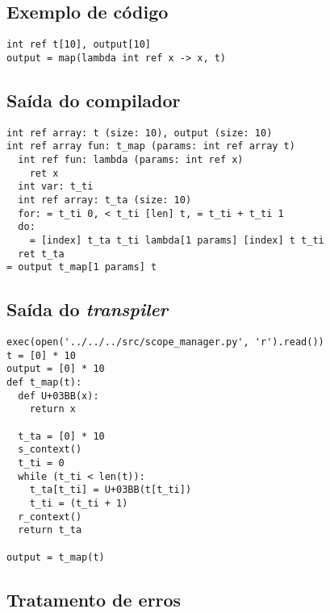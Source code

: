 \documentclass{sftex/sftex}
\begin{document}
\subsection{Exemplo de código}
\begin{verbatim}
int ref t[10], output[10]
output = map(lambda int ref x -> x, t)
\end{verbatim}

\subsection{Saída do compilador}

\begin{verbatim}
int ref array: t (size: 10), output (size: 10)
int ref array fun: t_map (params: int ref array t)
  int ref fun: lambda (params: int ref x)
    ret x
  int var: t_ti
  int ref array: t_ta (size: 10)
  for: = t_ti 0, < t_ti [len] t, = t_ti + t_ti 1
  do:
    = [index] t_ta t_ti lambda[1 params] [index] t t_ti
  ret t_ta
= output t_map[1 params] t
\end{verbatim}

\subsection{Saída do \emph{transpiler}}

\begin{verbatim}
exec(open('../../../src/scope_manager.py', 'r').read())
t = [0] * 10
output = [0] * 10
def t_map(t):
  def U+03BB(x):
    return x

  t_ta = [0] * 10
  s_context()
  t_ti = 0
  while (t_ti < len(t)):
    t_ta[t_ti] = U+03BB(t[t_ti])
    t_ti = (t_ti + 1)
  r_context()
  return t_ta

output = t_map(t)
\end{verbatim}

\subsection{Tratamento de erros}
\end{document}
